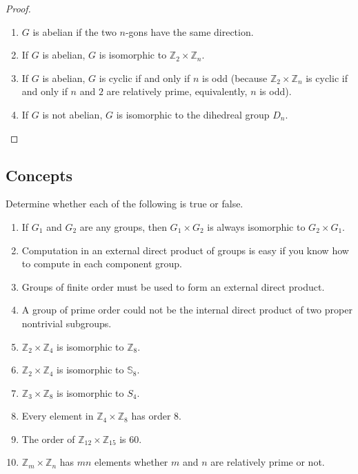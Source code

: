 \begin{proof}
    \begin{enumerate}[label={\textbf{\alph*.}}]
        \item $G$ is abelian if the two $n$-gons have the same direction.
        \item If $G$ is abelian, $G$ is isomorphic to $\mathbb{Z}_{2}\times\mathbb{Z}_{n}$.
        \item If $G$ is abelian, $G$ is cyclic if and only if $n$ is odd (because $\mathbb{Z}_{2}\times\mathbb{Z}_{n}$ is cyclic if and only if $n$ and $2$ are relatively prime, equivalently, $n$ is odd).
        \item If $G$ is not abelian, $G$ is isomorphic to the dihedreal group $D_{n}$.
    \end{enumerate}
\end{proof}

\subsection*{Concepts}

\newpage
\begin{exercise}
    Determine whether each of the following is true or false.
    \begin{enumerate}[label={\textbf{\alph*.}}]
        \item If $G_{1}$ and $G_{2}$ are any groups, then $G_{1} \times G_{2}$ is always isomorphic to $G_{2} \times G_{1}$.
        \item Computation in an external direct product of groups is easy if you know how to compute in each component group.
        \item Groups of finite order must be used to form an external direct product.
        \item A group of prime order could not be the internal direct product of two proper nontrivial subgroups.
        \item $\mathbb{Z}_{2}\times\mathbb{Z}_{4}$ is isomorphic to $\mathbb{Z}_{8}$.
        \item $\mathbb{Z}_{2}\times\mathbb{Z}_{4}$ is isomorphic to $\mathbb{S}_{8}$.
        \item $\mathbb{Z}_{3}\times\mathbb{Z}_{8}$ is isomorphic to $S_{4}$.
        \item Every element in $\mathbb{Z}_{4}\times\mathbb{Z}_{8}$ has order $8$.
        \item The order of $\mathbb{Z}_{12}\times\mathbb{Z}_{15}$ is $60$.
        \item $\mathbb{Z}_{m} \times \mathbb{Z}_{n}$ has $mn$ elements whether $m$ and $n$ are relatively prime or not.
    \end{enumerate}
\end{exercise}

